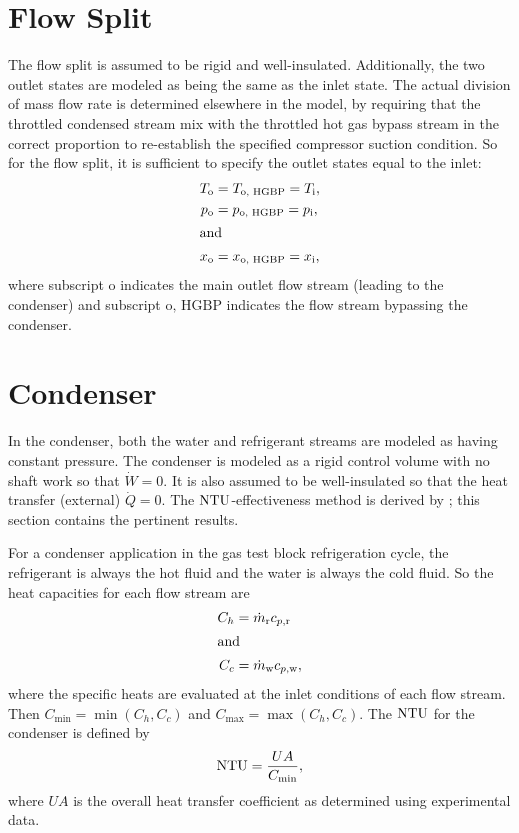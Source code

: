 \section{Flow Split} \label{sec:FlowSplit}
The flow split is assumed to be rigid and well-insulated.
Additionally, the two outlet states are modeled as being the same as the inlet state.
The actual division of mass flow rate is determined elsewhere in the model, 
by requiring that the throttled condensed stream mix with the throttled hot gas bypass
stream in the correct proportion to re-establish the specified compressor suction condition.
So for the flow split, it is sufficient to specify the outlet states equal to the inlet:
\begin{align}
  T_{\text{o}} &= T_{\text{o, HGBP}} = T_{\text{i}}, \\
  p_{\text{o}} &= p_{\text{o, HGBP}} = p_{\text{i}}, \\
  \shortintertext{and}
  x_{\text{o}} &= x_{\text{o, HGBP}} = x_{\text{i}},  
\end{align}
where subscript $\text{o}$ indicates the main outlet flow stream (leading to the condenser)
and subscript $\text{o, HGBP}$ indicates the flow stream bypassing the condenser.

\section{Condenser} \label{sec:Condenser}
In the condenser, both the water and refrigerant streams are modeled as having constant pressure.
The condenser is modeled as a rigid control volume with no shaft work so that $\dot{W}=0$.
It is also assumed to be well-insulated so that the heat transfer (external) $\dot{Q}=0$.
The $\mathrm{NTU}$-effectiveness method is derived by \textcite{incropera2007}; 
this section contains the pertinent results.

For a condenser application in the gas test block refrigeration cycle,
the refrigerant is always the hot fluid and the water is always the cold fluid.
So the heat capacities for each flow stream are
\begin{align}
  C_h &= \dot{m}_{\text{r}} c_{p,\text{r}} \\
  \shortintertext{and}
  C_c &= \dot{m}_{\text{w}} c_{p,\text{w}},
\end{align}
where the specific heats are evaluated at the inlet conditions of each flow stream.
Then $C_{\min} = \min{(C_h,C_c)}$ and $C_{\max} = \max{(C_h,C_c)}$. The $\mathrm{NTU}$
for the condenser is defined by
\begin{equation}
  \mathrm{NTU} = \frac{UA}{C_{\min}},
\end{equation}
where $UA$ is the overall heat transfer coefficient 
as determined using experimental data.

